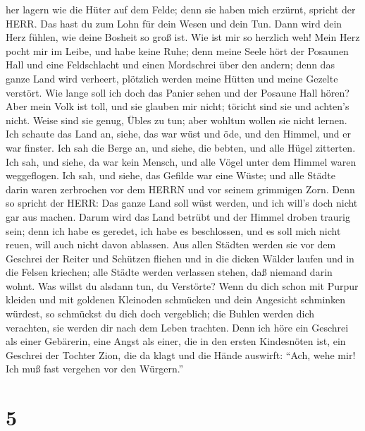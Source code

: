 her lagern wie die Hüter auf dem Felde; denn sie haben mich erzürnt,
spricht der HERR.  Das hast du zum Lohn für dein Wesen und
dein Tun. Dann wird dein Herz fühlen, wie deine Bosheit so groß ist.
 Wie ist mir so herzlich weh! Mein Herz pocht mir im Leibe,
und habe keine Ruhe; denn meine Seele hört der Posaunen Hall und eine
Feldschlacht  und einen Mordschrei über den andern; denn
das ganze Land wird verheert, plötzlich werden meine Hütten und meine
Gezelte verstört.  Wie lange soll ich doch das Panier sehen
und der Posaune Hall hören?  Aber mein Volk ist toll, und
sie glauben mir nicht; töricht sind sie und achten's nicht. Weise sind
sie genug, Übles zu tun; aber wohltun wollen sie nicht lernen.
 Ich schaute das Land an, siehe, das war wüst und öde, und
den Himmel, und er war finster.  Ich sah die Berge an, und
siehe, die bebten, und alle Hügel zitterten.  Ich sah, und
siehe, da war kein Mensch, und alle Vögel unter dem Himmel waren
weggeflogen.  Ich sah, und siehe, das Gefilde war eine
Wüste; und alle Städte darin waren zerbrochen vor dem HERRN und vor
seinem grimmigen Zorn.  Denn so spricht der HERR: Das ganze
Land soll wüst werden, und ich will's doch nicht gar aus machen.
 Darum wird das Land betrübt und der Himmel droben traurig
sein; denn ich habe es geredet, ich habe es beschlossen, und es soll
mich nicht reuen, will auch nicht davon ablassen.  Aus
allen Städten werden sie vor dem Geschrei der Reiter und Schützen
fliehen und in die dicken Wälder laufen und in die Felsen kriechen; alle
Städte werden verlassen stehen, daß niemand darin wohnt. 
Was willst du alsdann tun, du Verstörte? Wenn du dich schon mit Purpur
kleiden und mit goldenen Kleinoden schmücken und dein Angesicht
schminken würdest, so schmückst du dich doch vergeblich; die Buhlen
werden dich verachten, sie werden dir nach dem Leben trachten.
 Denn ich höre ein Geschrei als einer Gebärerin, eine Angst
als einer, die in den ersten Kindesnöten ist, ein Geschrei der Tochter
Zion, die da klagt und die Hände auswirft: ``Ach, wehe mir! Ich muß fast
vergehen vor den Würgern.''

\hypertarget{section-4}{%
\section{5}\label{section-4}}

